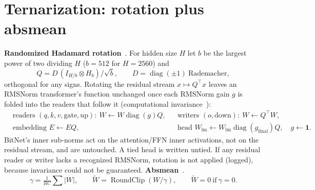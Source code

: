 \documentclass[11pt]{article}
\newcommand{\RoundClip}{\operatorname{RoundClip}}
\begin{document}
\section{Ternarization: rotation plus absmean}
\textbf{Randomized Hadamard rotation}~\cite{quarot}. For hidden size $H$ let $b$ be the largest power of two dividing $H$ ($b=512$ for $H=2560$) and
\begin{equation}Q=D\,(I_{H/b}\otimes H_b)/\sqrt b,\qquad D=\operatorname{diag}(\pm1)\ \text{Rademacher},\tag{23}\end{equation}
orthogonal for any signs. Rotating the residual stream $x\mapsto Q^{\top}x$ leaves an RMSNorm transformer's function unchanged once each RMSNorm gain $g$ is folded into the readers that follow it (computational invariance~\cite{slicegpt,quarot}):
\begin{equation}\begin{aligned}
&\text{readers }(q,k,v,\text{gate},\text{up}):\ W\leftarrow W\operatorname{diag}(g)Q, &&\text{writers }(o,\text{down}):\ W\leftarrow Q^{\top}W,\\
&\text{embedding }E\leftarrow EQ, &&\text{head }W_{\mathrm{lm}}\leftarrow W_{\mathrm{lm}}\operatorname{diag}(g_{\mathrm{final}})Q,\quad g\leftarrow\mathbf 1 .
\end{aligned}\tag{24}\end{equation}
BitNet's inner sub-norms act on the attention/FFN inner activations, not on the residual stream, and are untouched. A tied head is written untied. If any residual reader or writer lacks a recognized RMSNorm, rotation is not applied (logged), because invariance could not be guaranteed.
\textbf{Absmean}~\cite{bitnet158}.
\begin{equation}\gamma=\tfrac{1}{RC}\textstyle\sum|W|,\qquad \widetilde W=\RoundClip(W/\gamma),\qquad \widetilde W=0\ \text{if}\ \gamma=0 .\tag{25}\end{equation}
\end{document}
